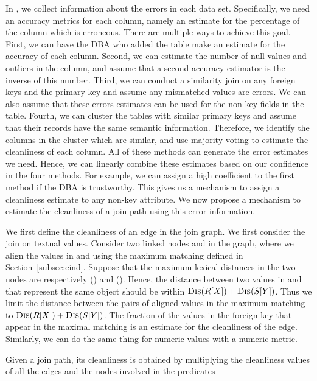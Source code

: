 In \dcv, we collect information about the errors in each data set. 
Specifically, we need an accuracy metrics for each column, namely an estimate for the percentage of the column which is erroneous. There are multiple ways to achieve this goal. 
First, we can have the DBA who added the table make an estimate for the accuracy of each column. 
Second, we can estimate the number of null values and outliers in the column, and assume that a second accuracy estimator is the inverse of this number. 
Third, we can conduct a similarity join on any foreign keys and the primary key and assume any mismatched values are errors. We can also assume that these errors estimates can be used for the non-key fields in the table. 
Fourth, we can cluster the tables with similar primary keys and assume that their records have the same semantic information.  Therefore, we identify the columns in the cluster which are similar, and use majority voting to estimate the cleanliness of each column. 
All of these methods can generate the  error estimates we need. Hence, we can linearly combine these estimates based on our confidence in the four methods. For example, we can assign a high coefficient to the first method if the DBA is trustworthy. 
This gives us a mechanism to assign a cleanliness estimate to any non-key attribute. 
We now propose a mechanism to estimate the cleanliness of a join path using this error information.


We first define the cleanliness of an edge in the join graph. We first consider the join on textual values. Consider two linked nodes \RX and \SY in the graph, where we align the values in \RX and \SY using the maximum matching defined in Section~\ref{subsec:eind}. Suppose that the maximum lexical distances in the two nodes are respectively \Dis(\RX) and \Dis(\SY). Hence, the distance between two values in \RX and \SY that represent the same object should be within $\textsc{Dis}(R[X])+\textsc{Dis}(S[Y])$. Thus we limit the distance between the pairs of aligned values in the maximum matching to $\textsc{Dis}(R[X])+\textsc{Dis}(S[Y])$. The fraction of the values in the foreign key that appear in the maximal matching is an estimate for the cleanliness of the edge. Similarly, we can do the same thing for numeric values with a numeric metric.

Given a join path, its cleanliness is obtained by multiplying the cleanliness values of all the edges and the nodes involved in the predicates 

